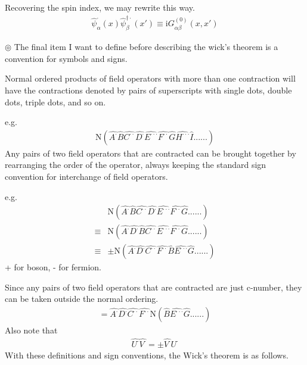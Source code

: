 ﻿\documentclass[twoside]{book}
\numberwithin{equation}{section}
\begin{document}
Recovering the spin index, we may rewrite this way.
\begin{align}\label{2.4.6}
\hat \psi^{\cdot}_{\alpha}(x)\hat \psi^{\dagger\cdot}_{\beta}(x')\equiv \mathrm{i}G_{\alpha\beta}^{(0)}(x,x')
\end{align}

$\circledcirc$ The final item I want to define before describing the wick's theorem is a convention for symbols and signs.

Normal ordered products of field operators with more than one contraction will have the contractions denoted by pairs of superscripts with single dots, double dots, triple dots, and so on.

e.g.
\begin{align}
\mathrm{N}(\hat{A^{\cdot}}\hat{B}\hat{C^{\cdot\cdot}}\hat{D^{\cdot}}\hat{E^{\cdot\cdot\cdot}}\hat{F^{\cdot\cdot}}\hat{G}\hat{H^{\cdot\cdot\cdot}}\hat{I}......)\nonumber
\end{align}
Any pairs of two field operators that are contracted can be brought together by rearranging the order of the operator, always keeping the standard sign convention for interchange of field operators.

e.g.
\begin{align}
&\mathrm{N}(\hat{A^{\cdot}}\hat{B}\hat{C^{\cdot\cdot}}\hat{D^{\cdot}}\hat{E^{\cdot\cdot\cdot}}\hat{F^{\cdot\cdot}}\hat{G}......)\nonumber \\
\equiv&\mathrm{N}(\hat{A^{\cdot}}\hat{D^{\cdot}}\hat{B}\hat{C^{\cdot\cdot}}\hat{E^{\cdot\cdot\cdot}}\hat{F^{\cdot\cdot}}\hat{G}......)\nonumber \\
\equiv&\pm\mathrm{N}(\hat{A^{\cdot}}\hat{D^{\cdot}}\hat{C^{\cdot\cdot}}\hat{F^{\cdot\cdot}}\hat{B}\hat{E^{\cdot\cdot\cdot}}\hat{G}......)\nonumber 
\end{align}
+ for boson, - for fermion.

Since any pairs of two field operators that are contracted are just c-number, they can be taken outside the normal ordering.
\begin{align}
=\hat{A^{\cdot}}\hat{D^{\cdot}}\hat{C^{\cdot\cdot}}\hat{F^{\cdot\cdot}}\mathrm{N}(\hat{B}\hat{E^{\cdot\cdot\cdot}}\hat{G}......)\nonumber 
\end{align}
Also note that
\begin{align}
\hat{U^{\cdot}}\hat{V^{\cdot}}=\pm\hat{V^{\cdot}}\hat{U^{\cdot}} \nonumber
\end{align}
With these definitions and sign conventions, the Wick's theorem is as follows.
\end{document}
